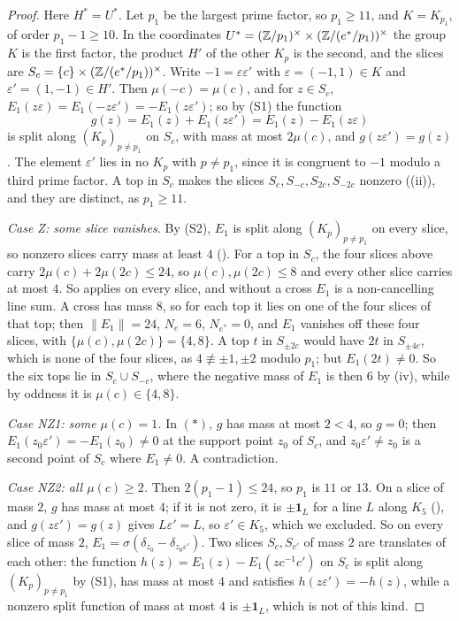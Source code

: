 \begin{proof}
Here $H^{*}=U^{*}$. Let $p_{1}$ be the largest prime factor, so $p_{1}\ge11$,
and $K=K_{p_{1}}$, of order $p_{1}-1\ge10$. In the coordinates
$U^{*}=(\mathbb{Z}/p_{1})^{\times}\times(\mathbb{Z}/(e^{*}/p_{1}))^{\times}$ the group $K$ is
the first factor, the product $H'$ of the other $K_{p}$ is the second, and
the slices are $S_{c}=\{c\}\times(\mathbb{Z}/(e^{*}/p_{1}))^{\times}$. Write
$-1=\varepsilon\varepsilon'$ with $\varepsilon=(-1,1)\in K$ and
$\varepsilon'=(1,-1)\in H'$. Then $\mu(-c)=\mu(c)$, and for $z\in S_{c}$,
$E_{1}(z\varepsilon)=E_{1}(-z\varepsilon')=-E_{1}(z\varepsilon')$; so by
(S1) the function
\[
  g(z)=E_{1}(z)+E_{1}(z\varepsilon')=E_{1}(z)-E_{1}(z\varepsilon)
  \tag{$*$}
\]
is split along $(K_{p})_{p\ne p_{1}}$ on $S_{c}$, with mass at most
$2\mu(c)$, and $g(z\varepsilon')=g(z)$. The element $\varepsilon'$ lies in no
$K_{p}$ with $p\ne p_{1}$, since it is congruent to $-1$ modulo a third prime
factor. A top in $S_{c}$ makes the slices $S_{c},S_{-c},S_{2c},S_{-2c}$
nonzero ((ii)), and they are distinct, as $p_{1}\ge11$.

\emph{Case Z: some slice vanishes.} By (S2), $E_{1}$ is split along
$(K_{p})_{p\ne p_{1}}$ on every slice, so nonzero slices carry mass at least
$4$ (). For a top in $S_{c}$, the four slices above carry
$2\mu(c)+2\mu(2c)\le24$, so $\mu(c),\mu(2c)\le8$ and every other slice
carries at most $4$. So  applies on every slice, and without a
cross $E_{1}$ is a non-cancelling line sum. A cross has mass $8$, so for each
top it lies on one of the four slices of that top; then $\|E_{1}\|=24$,
$N_{e}=6$, $N_{e^{*}}=0$, and $E_{1}$ vanishes off these four slices, with
$\{\mu(c),\mu(2c)\}=\{4,8\}$. A top $t$ in $S_{\pm2c}$ would have $2t$ in
$S_{\pm4c}$, which is none of the four slices, as $4\not\equiv\pm1,\pm2$
modulo $p_{1}$; but $E_{1}(2t)\ne0$. So the six tops lie in $S_{c}\cup
S_{-c}$, where the negative mass of $E_{1}$ is then $6$ by
(iv), while by oddness it is $\mu(c)\in\{4,8\}$.

\emph{Case NZ1: some $\mu(c)=1$.} In $(*)$, $g$ has mass at most $2<4$, so
$g=0$; then $E_{1}(z_{0}\varepsilon')=-E_{1}(z_{0})\ne0$ at the support point
$z_{0}$ of $S_{c}$, and $z_{0}\varepsilon'\ne z_{0}$ is a second point of
$S_{c}$ where $E_{1}\ne0$. A contradiction.

\emph{Case NZ2: all $\mu(c)\ge2$.} Then $2(p_{1}-1)\le24$, so $p_{1}$ is $11$
or $13$. On a slice of mass $2$, $g$ has mass at most $4$; if it is not
zero, it is $\pm\mathbf 1_{L}$ for a line $L$ along $K_{5}$ (),
and $g(z\varepsilon')=g(z)$ gives $L\varepsilon'=L$, so $\varepsilon'\in
K_{5}$, which we excluded. So on every slice of mass $2$,
$E_{1}=\sigma(\delta_{z_{0}}-\delta_{z_{0}\varepsilon'})$. Two slices
$S_{c},S_{c'}$ of mass $2$ are translates of each other: the function
$h(z)=E_{1}(z)-E_{1}(zc^{-1}c')$ on $S_{c}$ is split along $(K_{p})_{p\ne
p_{1}}$ by (S1), has mass at most $4$ and satisfies
$h(z\varepsilon')=-h(z)$, while a nonzero split function of mass at most $4$
is $\pm\mathbf 1_{L}$, which is not of this kind.


\end{proof}
